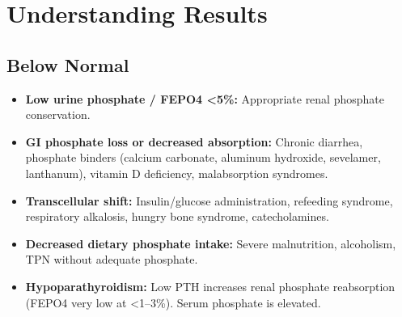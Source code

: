 \section*{Understanding Results}

\subsection*{Below Normal}
\begin{itemize}
  \item \textbf{Low urine phosphate / FEPO4 <5\%:} Appropriate renal phosphate conservation.
  \item \textbf{GI phosphate loss or decreased absorption:} Chronic diarrhea, phosphate binders (calcium carbonate, aluminum hydroxide, sevelamer, lanthanum), vitamin D deficiency, malabsorption syndromes.
  \item \textbf{Transcellular shift:} Insulin/glucose administration, refeeding syndrome, respiratory alkalosis, hungry bone syndrome, catecholamines.
  \item \textbf{Decreased dietary phosphate intake:} Severe malnutrition, alcoholism, TPN without adequate phosphate.
  \item \textbf{Hypoparathyroidism:} Low PTH increases renal phosphate reabsorption (FEPO4 very low at <1--3\%). Serum phosphate is elevated.
\end{itemize}

